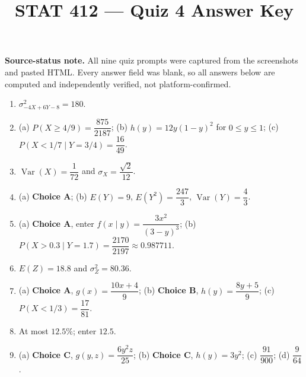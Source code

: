 \documentclass[11pt]{article}
\title{STAT 412 --- Quiz 4 Answer Key}
\author{}
\date{}
\begin{document}
\maketitle

\noindent\textbf{Source-status note.} All nine quiz prompts were captured from
the screenshots and pasted HTML. Every answer field was blank, so all answers
below are computed and independently verified, not platform-confirmed.

\begin{enumerate}[leftmargin=*,label=\textbf{\arabic*.}]
\item $\sigma_{-4X+6Y-8}^2=180$.

\item (a) $P(X\ge4/9)=\dfrac{875}{2187}$;\quad
(b) $h(y)=12y(1-y)^2$ for $0\le y\le1$;\quad
(c) $P(X<1/7\mid Y=3/4)=\dfrac{16}{49}$.

\item $\operatorname{Var}(X)=\dfrac1{72}$ and
$\sigma_X=\dfrac{\sqrt2}{12}$.

\item (a) \textbf{Choice A};\quad
(b) $E(Y)=9$, $E(Y^2)=\dfrac{247}{3}$,
$\operatorname{Var}(Y)=\dfrac43$.

\item (a) \textbf{Choice A}, enter
$f(x\mid y)=\dfrac{3x^2}{(3-y)^3}$;\quad
(b) $P(X>0.3\mid Y=1.7)=\dfrac{2170}{2197}\approx0.987711$.

\item $E(Z)=18.8$ and $\sigma_Z^2=80.36$.

\item (a) \textbf{Choice A},
$g(x)=\dfrac{10x+4}{9}$;\quad
(b) \textbf{Choice B},
$h(y)=\dfrac{8y+5}{9}$;\quad
(c) $P(X<1/3)=\dfrac{17}{81}$.

\item At most $12.5\%$; enter $12.5$.

\item (a) \textbf{Choice C},
$g(y,z)=\dfrac{6y^2z}{25}$;\quad
(b) \textbf{Choice C}, $h(y)=3y^2$;\quad
(c) $\dfrac{91}{900}$;\quad
(d) $\dfrac9{64}$.
\end{enumerate}
\end{document}
